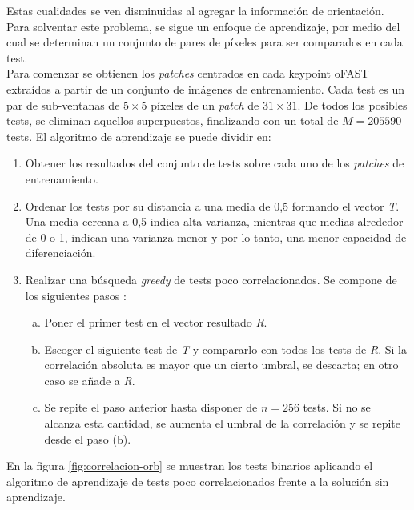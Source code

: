 Estas cualidades se ven disminuidas al agregar la información de orientación. Para solventar este problema, se sigue un enfoque de aprendizaje, por medio del cual se determinan un conjunto de pares de píxeles para ser comparados en cada test. \\
Para comenzar se obtienen los \textit{patches} centrados en cada keypoint oFAST extraídos a partir de un conjunto de imágenes de entrenamiento. Cada test es un par de sub-ventanas de $5 \times 5$ píxeles de un \textit{patch} de $31 \times 31$. De todos los posibles tests, se eliminan aquellos superpuestos, finalizando con un total de $M = 205590$ tests.
El algoritmo de aprendizaje se puede dividir en:

\begin{enumerate}

\item Obtener los resultados del conjunto de tests sobre cada uno de los \textit{patches} de entrenamiento.

\item Ordenar los tests por su distancia a una media de 0,5 formando el vector \textit{T}. Una media cercana a 0,5 indica alta varianza, mientras que medias alrededor de 0 o 1, indican una varianza menor y por lo tanto, una menor capacidad de diferenciación.

\item Realizar una búsqueda \textit{greedy} de tests poco correlacionados. Se compone de los siguientes pasos :
\begin{enumerate} [a)]
\item Poner el primer test en el vector resultado \textit{R}.

\item Escoger el siguiente test de \textit{T} y compararlo con todos los tests de \textit{R}. Si la correlación absoluta es mayor que un cierto umbral, se descarta; en otro caso se añade a \textit{R}.

\item Se repite el paso anterior hasta disponer de $n = 256$ tests. Si no se alcanza esta cantidad, se aumenta el umbral de la correlación y se repite desde el paso (b).
\end{enumerate}

\end{enumerate}

En la figura \ref{fig:correlacion-orb} se muestran los tests binarios aplicando el algoritmo de aprendizaje de tests poco correlacionados frente a la solución sin aprendizaje.

